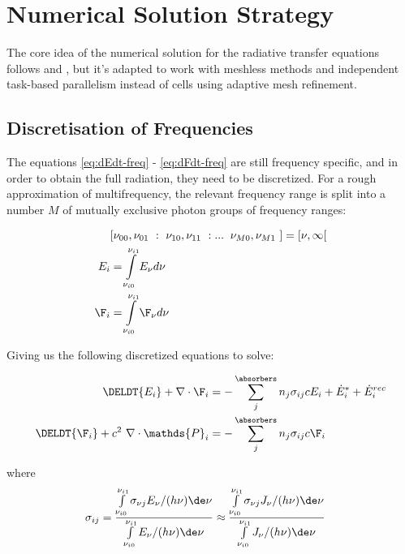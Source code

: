 \section{Numerical Solution Strategy}


The core idea of the numerical solution for the radiative transfer equations 
follows \cite{ramses-rt13} and \cite{ramses-rt15}, but it's adapted to work 
with meshless methods and independent task-based parallelism instead of cells 
using adaptive mesh refinement.







\subsection{Discretisation of Frequencies}



The equations \ref{eq:dEdt-freq} - \ref{eq:dFdt-freq} are still frequency specific, 
and in order to obtain the full radiation, they need to be discretized.
For a rough approximation of multifrequency, the relevant frequency range is 
split into a number $M$ of mutually exclusive photon groups of frequency ranges:

\begin{align}
	& [\nu_{00}, \nu_{01}\ :\ \nu_{10}, \nu_{11}\ : ... \: \ \nu_{M0}, \nu_{M1}\ ] = [\nu_{}, \infty [ \\
	E_i &= \int\limits_{\nu_{i0}}^{\nu_{i1}} E_\nu d\nu \\
	\F_i &= \int\limits_{\nu_{i0}}^{\nu_{i1}} \F_\nu d\nu
\end{align}


Giving us the following discretized equations to solve:


\begin{align}
	\DELDT{E_i} + \nabla \cdot \F_i &=
		- \sum\limits_{j}^{\absorbers} n_j \sigma_{i j} c E_i + \dot{E}_i^* + \dot{E}_i ^{rec}
		\label{eq:dEdt-group} \\
	\DELDT{\F_i} + c^2 \ \nabla \cdot \mathds{P}_i &=
		- \sum\limits_{j}^{\absorbers} n_j \sigma_{i j} c \F_i
		\label{eq:dFdt-group}
\end{align}


where
\begin{align}
	\sigma_{ij}
        &= \frac{
                \int\limits_{\nu_{i0}}^{\nu_{i1}} \sigma_{\nu j} E_\nu / (h \nu) \de \nu
            } { 
                \int\limits_{\nu_{i0}}^{\nu_{i1}} E_\nu / (h \nu) \de \nu
            }
		\approx \frac{
            \int\limits_{\nu_{i0}}^{\nu_{i1}} \sigma_{\nu j} J_\nu / (h \nu) \de \nu
            }{ 
                \int\limits_{\nu_{i0}}^{\nu_{i1}} J_\nu / (h \nu) \de \nu
            }
\end{align}

